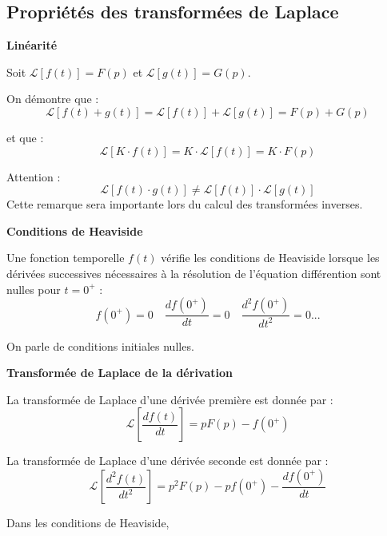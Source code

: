 \documentclass[11pt,oneside]{article}
\begin{document}
\subsection{Propriétés des transformées de Laplace}

\begin{prop}
\textbf{Linéarité}

Soit $\mathcal{L}\left[f(t)\right] = F(p)$ et $\mathcal{L}\left[g(t)\right] =
G(p)$.

On démontre que :
$$\mathcal{L}\left[f(t) + g(t)\right] = 
\mathcal{L}\left[f(t)\right] +\mathcal{L}\left[g(t)\right] = F(p)+G(p)$$

et que :
$$\mathcal{L}\left[K\cdot f(t)\right] = K\cdot \mathcal{L}\left[f(t)\right]
=K\cdot F(p)$$

\end{prop}

\begin{warn}
Attention : 
$$\mathcal{L}\left[f(t) \cdot g(t)\right] \neq \mathcal{L}\left[f(t)\right]
\cdot \mathcal{L}\left[g(t)\right] $$
Cette remarque sera importante lors du calcul des transformées inverses.
\end{warn}


\begin{prop}
\textbf{Conditions de Heaviside}

Une fonction temporelle $f(t)$ vérifie les conditions de Heaviside lorsque les dérivées successives nécessaires à la résolution de l'équation différention sont nulles pour $t={0^{+}}$ :
$$
f({0^{+}})=0 \quad \dfrac{df({0^{+}})}{dt} = 0 \quad \dfrac{d^2f({0^{+}})}{dt^2} = 0 ...
$$

On parle de conditions initiales nulles.
\end{prop}

\begin{prop}
\textbf{Transformée de Laplace de la dérivation}

La transformée de Laplace d'une dérivée première est donnée par : 
$$\mathcal{L}\left[ \dfrac{df(t)}{dt}\right] =pF(p)-f(0^+)$$

La transformée de Laplace d'une dérivée seconde est donnée par : 
$$\mathcal{L}\left[ \dfrac{d^2f(t)}{dt^2}\right] =p^2F(p)-pf(0^+)-\dfrac{df(0^+)}{dt}$$

Dans les conditions de Heaviside, 

\end{prop}
\end{document}

